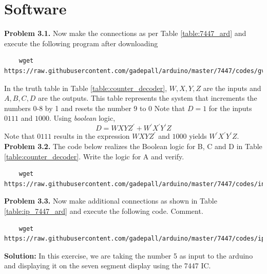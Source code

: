 \documentclass[journal,12pt,twocolumn]{IEEEtran}
\begin{document}
\section{Software}
\textbf{Problem 3.1.} Now make the connections as per Table \ref{table:7447_ard}  and execute the following program after downloading
\begin{lstlisting}
	wget https://raw.githubusercontent.com/gadepall/arduino/master/7447/codes/gvv_ard_7447/gvv_ard_7447.ino
\end{lstlisting}
\begin{table}[!h]
\centering

\caption{}
\label{table:7447_ard}
\end{table}
In the  truth table in Table \ref{table:counter_decoder},  $W,X,Y,Z$ are the inputs
and $A,B,C,D$ are the outputs. This table represents the system that increments the numbers 0-8 by 1 and resets the number 9 to 0
%
Note that  $D = 1$ for the inputs $0111$ and $1000$.  Using {\em boolean} logic,
%
\begin{equation}
\label{bool_logic}
D = WXYZ^{'} + W^{'}X^{'}Y^{'}Z
\end{equation}
%
Note that $0111$ results in the expression $WXYZ^{'}$ and $1000$ yields $W^{'}X^{'}Y^{'}Z$. \\
%
\textbf{Problem 3.2.} The code below realizes the Boolean logic for B, C and D in  Table \ref{table:counter_decoder}.  Write the logic for A and verify.
\begin{lstlisting}
	wget https://raw.githubusercontent.com/gadepall/arduino/master/7447/codes/inc_dec/inc_dec.ino
\end{lstlisting}
\begin{table}[!h]
\centering	

\caption{}
\label{table:counter_decoder}
\end{table}
\textbf{Problem 3.3.} Now make additional connections as shown in Table \ref{table:ip_7447_ard} and execute the following code.  Comment.
\begin{lstlisting}
	wget https://raw.githubusercontent.com/gadepall/arduino/master/7447/codes/ip_inc_dec/ip_inc_dec.ino
\end{lstlisting}
\textbf{Solution:} In this exercise, we are taking the number 5 as input to the arduino and displaying it on the seven segment display using the 7447 IC.\\
\end{document}
